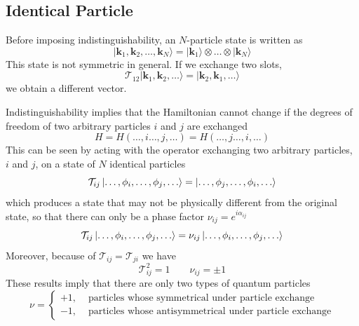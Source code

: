 \documentclass[../../../main.tex]{subfiles}
\begin{document}
\subsection{Identical Particle}
Before imposing indistinguishability, an $N$-particle state is written as
\begin{equation*}
  |\mathbf{k}_1, \mathbf{k}_2, \ldots, \mathbf{k}_N\rangle = |\mathbf{k}_1\rangle \otimes \ldots \otimes |\mathbf{k}_N\rangle
\end{equation*}
This state is not symmetric in general.
If we exchange two slots,
\begin{equation*}
  \mathcal{T}_{12}|\mathbf{k}_1, \mathbf{k}_2, \ldots \rangle = |\mathbf{k}_2, \mathbf{k}_1, \ldots \rangle
\end{equation*}
we obtain a different vector.

Indistinguishability implies that the Hamiltonian cannot change if the degrees of freedom of two arbitrary particles $i$ and $j$ are exchanged
\begin{equation*}
  {H } = {H} (\dots,i\dots,j,\dots) = {H} (\dots,j\dots,i,\dots)
\end{equation*}
This can be seen by acting with the operator exchanging two arbitrary particles, $i$ and $j$, on a state of $N$ identical particles
\begin{equation*}
  \mathcal{T }_{ij} \ket{\dots, \phi_i,\dots,\phi_j,\dots} = \ket{\dots, \phi_j,\dots,\phi_i,\dots}
\end{equation*}
which produces a state that may not be physically different from the original state, so that there can only be a phase factor $\nu_{ij }=e ^{i\alpha_{ij}}$
\begin{equation*}
  \mathcal{T }_{ij} \ket{\dots, \phi_i,\dots,\phi_j,\dots} = \nu_{ij }\ket{\dots, \phi_i,\dots,\phi_j,\dots}
\end{equation*}
Moreover, because of $\mathcal{T}_{ij }=\mathcal{T}_{ji}$ we have
\begin{equation*}
  \mathcal{T}_{ij }^{2 }=1\qquad\nu_{ij }=\pm1
\end{equation*}
These results imply that there are only two types of quantum particles
\begin{equation*}
  \nu = \begin{cases}
    +1, & \text{ particles whose symmetrical under particle exchange}     \\
    -1, & \text{ particles whose antisymmetrical under particle exchange}
  \end{cases}
\end{equation*}
\end{document}
